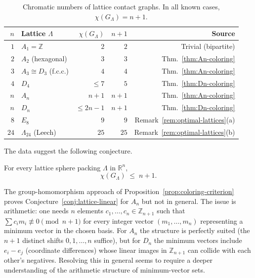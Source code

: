 \begin{table}[h]
\centering
\begin{tabular}{r|l|r|r|r}
$n$ & Lattice $\Lambda$ & $\chi(G_\Lambda)$ & $n+1$ & Source \\ \hline
$1$ & $A_1 = \mathbb{Z}$ & $2$ & $2$ & Trivial (bipartite) \\
$2$ & $A_2$ (hexagonal) & $3$ & $3$ & Thm.~\ref{thm:An-coloring} \\
$3$ & $A_3 \cong D_3$ (f.c.c.) & $4$ & $4$ & Thm.~\ref{thm:An-coloring} \\
$4$ & $D_4$ & $\le 7$ & $5$ & Thm.~\ref{thm:Dn-coloring} \\
$n$ & $A_n$ & $n+1$ & $n+1$ & Thm.~\ref{thm:An-coloring} \\
$n$ & $D_n$ & $\le 2n-1$ & $n+1$ & Thm.~\ref{thm:Dn-coloring} \\
$8$ & $E_8$ & $9$ & $9$ & Remark~\ref{rem:optimal-lattices}(a) \\
$24$ & $\Lambda_{24}$ (Leech) & $25$ & $25$ & Remark~\ref{rem:optimal-lattices}(b) \\
\end{tabular}
\caption{Chromatic numbers of lattice contact graphs.  In all known cases, $\chi(G_\Lambda) = n+1$.}
\end{table}

The data suggest the following conjecture.

\begin{conjecture}\label{conj:lattice-linear}
For every lattice sphere packing $\Lambda$ in $\mathbb{R}^n$,
\[
  \chi(G_\Lambda) \;\le\; n + 1.
\]
\end{conjecture}

\begin{remark}
The group-homomorphism approach of Proposition~\ref{prop:coloring-criterion} proves Conjecture~\ref{conj:lattice-linear} for $A_n$ but not in general.  The issue is arithmetic: one needs $n$ elements $c_1, \ldots, c_n \in \mathbb{Z}_{n+1}$ such that $\sum c_i m_i \not\equiv 0 \pmod{n+1}$ for every integer vector $(m_1,\ldots,m_n)$ representing a minimum vector in the chosen basis.  For $A_n$ the structure is perfectly suited (the $n+1$ distinct shifts $0,1,\ldots,n$ suffice), but for $D_n$ the minimum vectors include $e_i - e_j$ (coordinate differences) whose linear images in $\mathbb{Z}_{n+1}$ can collide with each other's negatives.  Resolving this in general seems to require a deeper understanding of the arithmetic structure of minimum-vector sets.
\end{remark}

